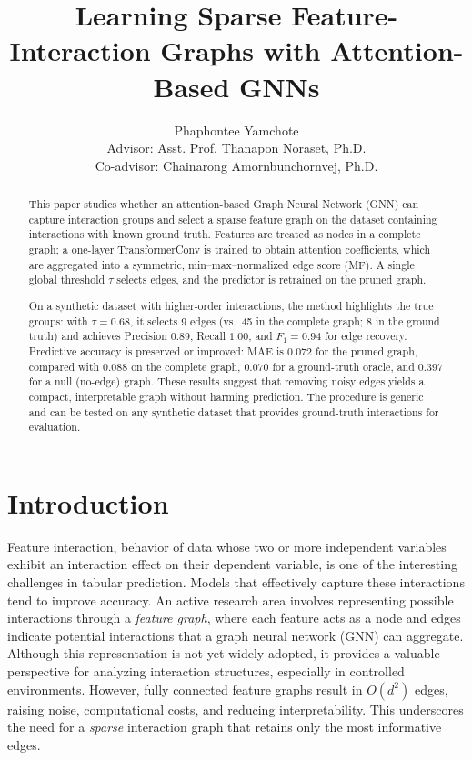 \documentclass[10pt,a4paper]{article}
\title{Learning Sparse Feature-Interaction Graphs with Attention-Based GNNs}
\author{Phaphontee Yamchote\\ Advisor: Asst. Prof. Thanapon Noraset, Ph.D. \\ Co-advisor: Chainarong Amornbunchornvej, Ph.D.}
\date{}
\begin{document}
\maketitle

\begin{abstract}
This paper studies whether an attention-based Graph Neural Network (GNN) can capture interaction groups and select a sparse feature graph on the dataset containing interactions with known ground truth. Features are treated as nodes in a complete graph; a one-layer TransformerConv is trained to obtain attention coefficients, which are aggregated into a symmetric, min–max–normalized edge score (MF). A single global threshold $\tau$ selects edges, and the predictor is retrained on the pruned graph.

On a synthetic dataset with higher-order interactions, the method highlights the true groups: with $\tau{=}0.68$, it selects 9 edges (vs.\ 45 in the complete graph; 8 in the ground truth) and achieves Precision $0.89$, Recall $1.00$, and $F_1{=}0.94$ for edge recovery. Predictive accuracy is preserved or improved: MAE is $0.072$ for the pruned graph, compared with $0.088$ on the complete graph, $0.070$ for a ground-truth oracle, and $0.397$ for a null (no-edge) graph. These results suggest that removing noisy edges yields a compact, interpretable graph without harming prediction. The procedure is generic and can be tested on any synthetic dataset that provides ground-truth interactions for evaluation.
\end{abstract}



\section{Introduction}
Feature interaction, behavior of data whose two or more independent variables exhibit an interaction effect on their dependent variable, is one of the interesting challenges in tabular prediction\cite{molnar2020interpretable}. Models that effectively capture these interactions tend to improve accuracy. An active research area involves representing possible interactions through a \emph{feature graph}, where each feature acts as a node and edges indicate potential interactions that a graph neural network (GNN) can aggregate. Although this representation is not yet widely adopted, it provides a valuable perspective for analyzing interaction structures, especially in controlled environments. However, fully connected feature graphs result in $O(d^2)$ edges, raising noise, computational costs, and reducing interpretability. This underscores the need for a \emph{sparse} interaction graph that retains only the most informative edges.
\end{document}
